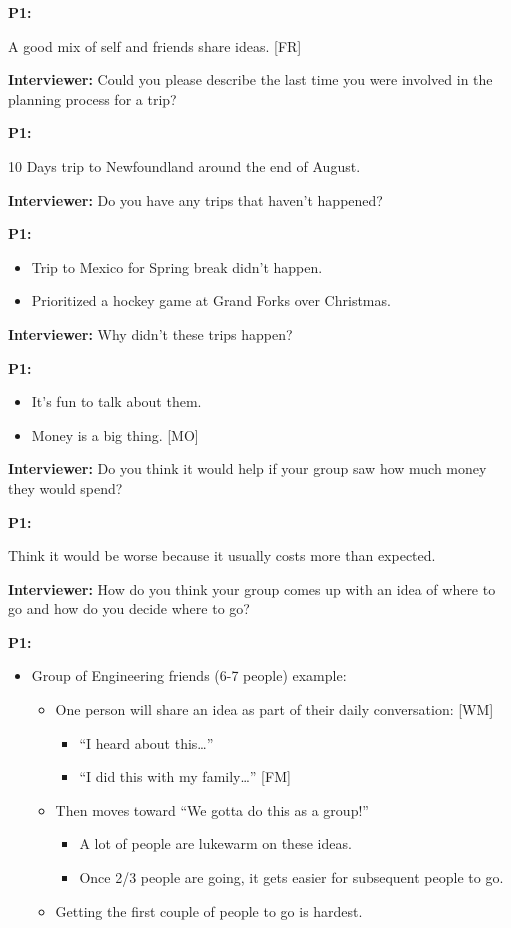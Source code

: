 \documentclass[12pt,a4paper]{article}
\begin{document}
\textbf{P1:}

A good mix of self and friends share ideas. [FR]

\textbf{Interviewer:} Could you please describe the last time you were involved in the planning process for a trip? 

\textbf{P1:}
    
10 Days trip to Newfoundland around the end of August.

\textbf{Interviewer:} Do you have any trips that haven’t happened? 

\textbf{P1:}

\begin{itemize}
    \item Trip to Mexico for Spring break didn’t happen. 
    \item Prioritized a hockey game at Grand Forks over Christmas.
\end{itemize}

\textbf{Interviewer:} Why didn’t these trips happen? 

\textbf{P1:}

\begin{itemize}
    \item It’s fun to talk about them.
    \item Money is a big thing. [MO]
\end{itemize}

\textbf{Interviewer:} Do you think it would help if your group saw how much money they would spend? 

\textbf{P1:}

Think it would be worse because it usually costs more than expected.

\textbf{Interviewer:} How do you think your group comes up with an idea of where to go and how do you decide where to go?

\textbf{P1: }

\begin{itemize}
    \item Group of Engineering friends (6-7 people) example: 
    \begin{itemize}
        \item One person will share an idea as part of their daily conversation: [WM]
        \begin{itemize}
            \item “I heard about this…”
            \item “I did this with my family…” [FM]
        \end{itemize}
        \item Then moves toward “We gotta do this as a group!”
        \begin{itemize}
            \item A lot of people are lukewarm on these ideas. 
            \item Once 2/3 people are going, it gets easier for subsequent people to go. 
        \end{itemize}
        \item Getting the first couple of people to go is hardest. 
    \end{itemize}
\end{itemize}
\end{document}
